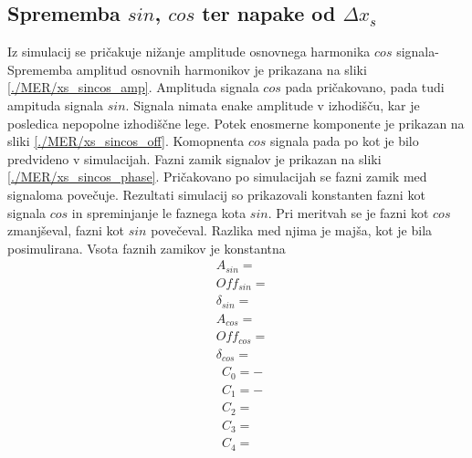 \subsection{Sprememba $sin$, $cos$ ter napake od $\Delta x_s$}
Iz simulacij se pričakuje nižanje amplitude osnovnega harmonika $cos$ signala- Sprememba amplitud osnovnih harmonikov je prikazana na sliki \ref{./MER/xs_sincos_amp}. Amplituda signala $cos$ pada pričakovano, pada tudi ampituda signala $sin$. Signala nimata enake amplitude v izhodišču, kar je posledica nepopolne izhodiščne lege. Potek enosmerne komponente je prikazan na sliki \ref{./MER/xs_sincos_off}. Komopnenta $cos$ signala pada po kot je bilo predvideno v simulacijah. Fazni zamik signalov je prikazan na sliki \ref{./MER/xs_sincos_phase}. Pričakovano po simulacijah se fazni zamik med signaloma povečuje. Rezultati simulacij so prikazovali konstanten fazni kot signala $cos$ in spreminjanje le faznega kota $sin$. Pri meritvah se je fazni kot $cos$ zmanjševal, fazni kot $sin$ povečeval. Razlika med njima je majša, kot je bila posimulirana. Vsota faznih zamikov je konstantna 
\begin{eqnarray}
&A_{sin} = \\     
&Off_{sin} = \\   
&\delta_{sin} = \\
&A_{cos} = \\     
&Off_{cos} = \\   
&\delta_{cos} =
\end{eqnarray}
\begin{eqnarray}
&C_0 =- \\
&C_1 =-\\             
&C_2 =\\                  
&C_3 = \\ 
&C_4 =
\end{eqnarray}







